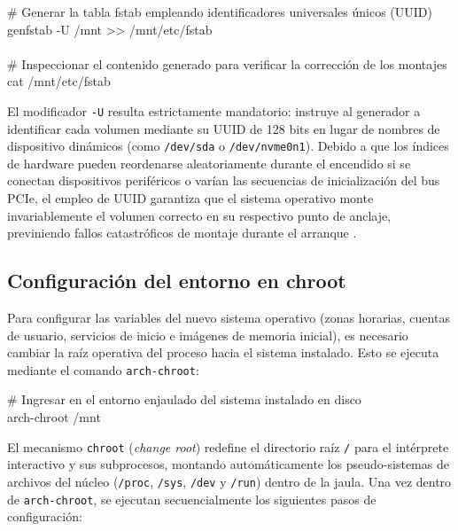 \documentclass[12pt]{article}
\begin{document}
\begin{mdframed}[style=terminal]
\ttfamily\upshape\color{bashLetterColor}\footnotesize
\# Generar la tabla fstab empleando identificadores universales únicos (UUID) \\
genfstab -U /mnt >> /mnt/etc/fstab \\
\\
\# Inspeccionar el contenido generado para verificar la corrección de los montajes \\
cat /mnt/etc/fstab
\end{mdframed}

El modificador \texttt{-U} resulta estrictamente mandatorio: instruye al generador a identificar cada volumen mediante su UUID de 128 bits en lugar de nombres de dispositivo dinámicos (como \texttt{/dev/sda} o \texttt{/dev/nvme0n1}). Debido a que los índices de hardware pueden reordenarse aleatoriamente durante el encendido si se conectan dispositivos periféricos o varían las secuencias de inicialización del bus PCIe, el empleo de UUID garantiza que el sistema operativo monte invariablemente el volumen correcto en su respectivo punto de anclaje, previniendo fallos catastróficos de montaje durante el arranque \parencite[\S 11.5, pp.\ 521--523]{stallings2018operating}.

\subsection{Configuración del entorno en chroot}
\label{sec:configuracionChroot}

Para configurar las variables del nuevo sistema operativo (zonas horarias, cuentas de usuario, servicios de inicio e imágenes de memoria inicial), es necesario cambiar la raíz operativa del proceso hacia el sistema instalado. Esto se ejecuta mediante el comando \texttt{arch-chroot}:

\begin{mdframed}[style=terminal]
\ttfamily\upshape\color{bashLetterColor}\footnotesize
\# Ingresar en el entorno enjaulado del sistema instalado en disco \\
arch-chroot /mnt
\end{mdframed}

El mecanismo \texttt{chroot} (\textit{change root}) redefine el directorio raíz \texttt{/} para el intérprete interactivo y sus subprocesos, montando automáticamente los pseudo-sistemas de archivos del núcleo (\texttt{/proc}, \texttt{/sys}, \texttt{/dev} y \texttt{/run}) dentro de la jaula. Una vez dentro de \texttt{arch-chroot}, se ejecutan secuencialmente los siguientes pasos de configuración:
\end{document}
